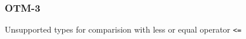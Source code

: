 \subsubsection{OTM-3}\label{sec:error_code_otm_3}

Unsupported types for comparision with less or equal operator \texttt{<=}


